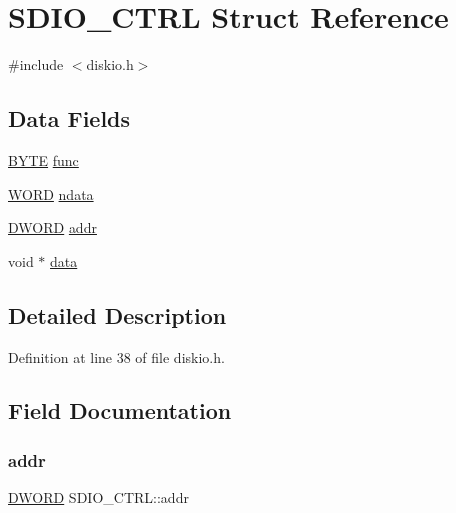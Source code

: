 \hypertarget{structSDIO__CTRL}{}\section{S\+D\+I\+O\+\_\+\+C\+T\+RL Struct Reference}
\label{structSDIO__CTRL}


{\ttfamily \#include $<$diskio.\+h$>$}

\subsection*{Data Fields}
\begin{DoxyCompactItemize}
\item 
\hyperlink{ff_8h_a4ae1dab0fb4b072a66584546209e7d58}{B\+Y\+TE} \hyperlink{structSDIO__CTRL_a2f0a17848a6c7c58f826d1888469e6e3}{func}
\item 
\hyperlink{ff_8h_a197942eefa7db30960ae396d68339b97}{W\+O\+RD} \hyperlink{structSDIO__CTRL_a44edc7d37688ac4f3a1ba3d66e909767}{ndata}
\item 
\hyperlink{ff_8h_ad342ac907eb044443153a22f964bf0af}{D\+W\+O\+RD} \hyperlink{structSDIO__CTRL_a15025848d3f3733f366504d30a1d9bb2}{addr}
\item 
void $\ast$ \hyperlink{structSDIO__CTRL_ab04c9adb4d3027a14925fb30b469f0c0}{data}
\end{DoxyCompactItemize}


\subsection{Detailed Description}


Definition at line 38 of file diskio.\+h.



\subsection{Field Documentation}
\mbox{\label{structSDIO__CTRL_a15025848d3f3733f366504d30a1d9bb2}} 
\subsubsection{\texorpdfstring{addr}{addr}}
{\footnotesize\ttfamily \hyperlink{ff_8h_ad342ac907eb044443153a22f964bf0af}{D\+W\+O\+RD} S\+D\+I\+O\+\_\+\+C\+T\+R\+L\+::addr}



